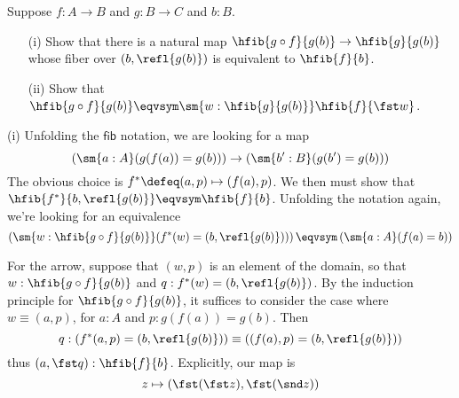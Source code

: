 Suppose $f : A \to B$ and $g : B \to C$ and $b : B$.
\begin{itemize}
  \item[(i)] Show that there is a natural map $\hfib{g \circ f}{g(b)} \to
      \hfib{g}{g(b)}$ whose fiber over $(b, \refl{g(b)})$ is equivalent to
      $\hfib{f}{b}$.
  \item[(ii)] Show that $\hfib{g \circ f}{g(b)} \eqvsym \sm{w:\hfib{g}{g(b)}}
      \hfib{f}{\fst w}$.
\end{itemize}


 \soln
(i) Unfolding the $\mathsf{fib}$ notation, we are looking for a map
\[
  \left(\sm{a:A} (g(f(a)) = g(b))\right) \to
  \left(\sm{b':B} (g(b') = g(b))\right)
\]
The obvious choice is $f^{*} \defeq (a, p) \mapsto (f(a), p)$.  We then must
show that $\hfib{f^{*}}{b, \refl{g(b)}} \eqvsym \hfib{f}{b}$.  Unfolding the
notation again, we're looking for an equivalence
\[
  \left(\sm{w:\hfib{g \circ f}{g(b)}} (f^{*}(w) = (b, \refl{g(b)}))\right)
  \eqvsym
  \left(\sm{a:A} (f(a) = b)\right)
\]


For the arrow, suppose that $(w, p)$ is an element of the domain, so that $w :
\hfib{g \circ f}{g(b)}$ and $q : f^{*}(w) = (b, \refl{g(b)})$.  By the
induction principle for $\hfib{g \circ f}{g(b)}$, it suffices to consider the
case where $w \equiv (a, p)$, for $a : A$ and $p : g(f(a)) = g(b)$.  Then
\[
  q : 
  (f^{*}(a, p) = (b, \refl{g(b)})) 
  \equiv
  ((f(a), p) = (b, \refl{g(b)})) 
\]
thus $(a, \fst q) : \hfib{f}{b}$.  Explicitly, our map is
\[
  z \mapsto (\fst(\fst z), \fst (\snd z))
\]


